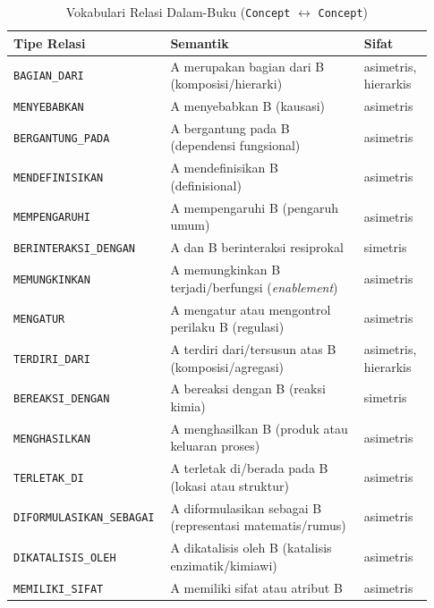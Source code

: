 \documentclass[../../thesis]{subfiles}
\begin{document}
\begin{table}[htbp]
\centering
\caption{Vokabulari Relasi Dalam-Buku
    (\texttt{Concept} $\leftrightarrow$ \texttt{Concept})}
\label{tab:relasi-dalam-buku}
\begin{tabular}{@{}p{0.32\linewidth}p{0.45\linewidth}p{0.16\linewidth}@{}}
  \toprule
  \textbf{Tipe Relasi} & \textbf{Semantik} & \textbf{Sifat} \\
  \midrule
  \texttt{BAGIAN\_DARI}
    & A merupakan bagian dari B (komposisi/hierarki)
    & asimetris, hierarkis \\
  \texttt{MENYEBABKAN}
    & A menyebabkan B (kausasi)
    & asimetris \\
  \texttt{BERGANTUNG\_PADA}
    & A bergantung pada B (dependensi fungsional)
    & asimetris \\
  \texttt{MENDEFINISIKAN}
    & A mendefinisikan B (definisional)
    & asimetris \\
  \texttt{MEMPENGARUHI}
    & A mempengaruhi B (pengaruh umum)
    & asimetris \\
  \texttt{BERINTERAKSI\_DENGAN}
    & A dan B berinteraksi resiprokal
    & simetris \\
  \texttt{MEMUNGKINKAN}
    & A memungkinkan B terjadi/berfungsi (\textit{enablement})
    & asimetris \\
  \texttt{MENGATUR}
    & A mengatur atau mengontrol perilaku B (regulasi)
    & asimetris \\
  \texttt{TERDIRI\_DARI}
    & A terdiri dari/tersusun atas B (komposisi/agregasi)
    & asimetris, hierarkis \\
  \texttt{BEREAKSI\_DENGAN}
    & A bereaksi dengan B (reaksi kimia)
    & simetris \\
  \texttt{MENGHASILKAN}
    & A menghasilkan B (produk atau keluaran proses)
    & asimetris \\
  \texttt{TERLETAK\_DI}
    & A terletak di/berada pada B (lokasi atau struktur)
    & asimetris \\
  \texttt{DIFORMULASIKAN\_SEBAGAI}
    & A diformulasikan sebagai B (representasi matematis/rumus)
    & asimetris \\
  \texttt{DIKATALISIS\_OLEH}
    & A dikatalisis oleh B (katalisis enzimatik/kimiawi)
    & asimetris \\
  \texttt{MEMILIKI\_SIFAT}
    & A memiliki sifat atau atribut B
    & asimetris \\
\end{tabular}
\end{table}
\end{document}
